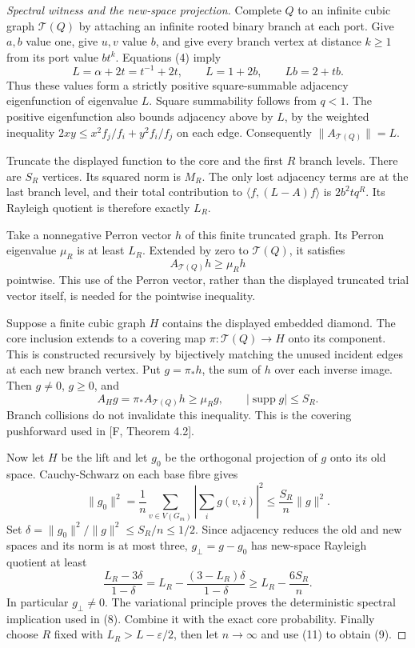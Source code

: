 \documentclass[11pt]{article}
\begin{document}
\begin{proof}[Spectral witness and the new-space projection]
Complete $Q$ to an infinite cubic graph $\mathcal T(Q)$ by attaching an
infinite rooted binary branch at each port. Give $a,b$ value one, give
$u,v$ value $b$, and give every branch vertex at distance $k\geq1$ from
its port value $bt^k$. Equations (4) imply
\[
 L=\alpha+2t=t^{-1}+2t,
 \qquad L=1+2b,
 \qquad Lb=2+tb.
 \tag{12}
\]
Thus these values form a strictly positive square-summable adjacency
eigenfunction of eigenvalue $L$. Square summability follows from $q<1$.
The positive eigenfunction also bounds adjacency above by $L$, by the
weighted inequality $2xy\leq x^2 f_j/f_i+y^2 f_i/f_j$ on each edge.
Consequently $\|A_{\mathcal T(Q)}\|=L$.

Truncate the displayed function to the core and the first $R$ branch
levels. There are $S_R$ vertices. Its squared norm is $M_R$. The only
lost adjacency terms are at the last branch level, and their total
contribution to $\langle f,(L-A)f\rangle$ is $2b^2tq^R$. Its Rayleigh
quotient is therefore exactly $L_R$.

Take a nonnegative Perron vector $h$ of this finite truncated graph.
Its Perron eigenvalue $\mu_R$ is at least $L_R$. Extended by zero to
$\mathcal T(Q)$, it satisfies
\[
 A_{\mathcal T(Q)}h\geq\mu_R h
 \tag{13}
\]
pointwise. This use of the Perron vector, rather than the displayed
truncated trial vector itself, is needed for the pointwise inequality.

Suppose a finite cubic graph $H$ contains the displayed embedded diamond.
The core inclusion extends to a covering map
$\pi:\mathcal T(Q)\to H$ onto its component. This is constructed
recursively by bijectively matching the unused incident edges at each
new branch vertex. Put $g=\pi_*h$, the sum of $h$ over each inverse
image. Then $g\ne0$, $g\geq0$, and
\[
 A_Hg=\pi_*A_{\mathcal T(Q)}h\geq\mu_Rg,
 \qquad |\operatorname{supp}g|\leq S_R.
 \tag{14}
\]
Branch collisions do not invalidate this inequality. This is the covering
pushforward used in [F, Theorem 4.2].

Now let $H$ be the lift and let $g_0$ be the orthogonal projection of $g$
onto its old space. Cauchy-Schwarz on each base fibre gives
\[
 \|g_0\|^2=\frac1n\sum_{v\in V(G_m)}
     \left|\sum_i g(v,i)\right|^2
 \leq\frac{S_R}{n}\|g\|^2.
 \tag{15}
\]
Set $\delta=\|g_0\|^2/\|g\|^2\leq S_R/n\leq1/2$.
Since adjacency reduces the old and new spaces and its norm is at most
three, $g_\perp=g-g_0$ has new-space Rayleigh quotient at least
\[
 \frac{L_R-3\delta}{1-\delta}
 =L_R-\frac{(3-L_R)\delta}{1-\delta}
 \geq L_R-\frac{6S_R}{n}.
 \tag{16}
\]
In particular $g_\perp\ne0$. The variational principle proves the
deterministic spectral implication used in (8). Combine it with the exact
core probability. Finally choose $R$ fixed with $L_R>L-\varepsilon/2$,
then let $n\to\infty$ and use (11) to obtain (9).
\end{proof}
\end{document}
